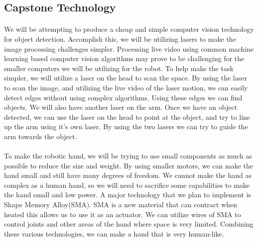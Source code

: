 \documentclass{article}
\begin{document}
\subsection{Capstone Technology} \paragraph{} We will be attempting to produce
a cheap and simple computer vision technology for object detection. Accomplish
this, we will be utilizing lasers to make the image processing challenges
simpler. Processing live video using common machine learning based computer
vision algorithms may prove to be challenging for the smaller computers we will
be utilizing for the robot. To help make the task simpler, we will utilize a
laser on the head to scan the space. By using the laser to scan the image, and
utilizing the live video of the laser motion, we can easily detect edges
without using complex algorithms. Using these edges we can find objects. We
will also have another laser on the arm. Once we have an object detected, we
can use the laser on the head to point at the object, and try to line up the
arm using it's own laser. By using the two lasers we can try to guide the arm
towards the object.

\paragraph{} To make the robotic hand, we will be trying to use small
components as much as possible to reduce the size and weight. By using smaller
motors, we can make the hand small and still have many degrees of freedom. We
cannot make the hand as complex as a human hand, so we will need to sacrifice
some capabilities to make the hand small and low power. A major technology that
we plan to implement is Shape Memory Alloy(SMA). SMA is a new material that can
contract when heated this allows us to use it as an actuator. We can utilize
wires of SMA to control joints and other areas of the hand where space is very
limited. Combining these various technologies, we can make a hand that is very
human-like.



\end{document}

